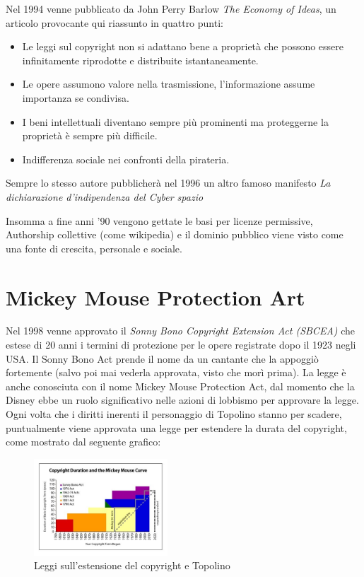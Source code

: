 Nel 1994 venne pubblicato da John Perry Barlow \textit{The Economy of Ideas}, un articolo provocante qui riassunto in quattro punti:
\begin{itemize}
\item Le leggi sul copyright non si adattano bene a proprietà che possono essere infinitamente riprodotte e distribuite istantaneamente.
\item Le opere assumono valore nella trasmissione, l'informazione assume importanza se condivisa.
\item I beni intellettuali diventano sempre più prominenti ma proteggerne la proprietà è sempre più difficile.
\item Indifferenza sociale nei confronti della pirateria.
\end{itemize}
Sempre lo stesso autore pubblicherà nel 1996 un altro famoso manifesto \textit{La dichiarazione d'indipendenza del Cyber spazio}

Insomma a fine anni '90 vengono gettate le basi per licenze permissive, Authorship collettive (come wikipedia) e il dominio pubblico viene visto come una fonte di crescita, personale e sociale.

\section{Mickey Mouse Protection Art}

Nel 1998 venne approvato il \textit{Sonny Bono Copyright
Extension Act (SBCEA)} che estese di 20 anni i termini di protezione per le opere registrate dopo il 1923 negli USA. Il Sonny Bono Act prende il nome da un cantante che la appoggiò fortemente (salvo poi mai vederla approvata, visto che morì prima). La legge è anche conosciuta con il nome Mickey Mouse Protection Act, dal momento che la Disney ebbe un ruolo significativo nelle azioni di lobbismo per approvare la legge. Ogni volta che i diritti inerenti il personaggio di Topolino stanno per scadere, puntualmente viene approvata una legge per estendere la durata del copyright, come mostrato dal seguente grafico:

\begin{figure}[htbp]
\centering
\includegraphics[width=50mm]{images/MM_copyright_graph}
\caption{Leggi sull'estensione del copyright e Topolino}
\end{figure}

